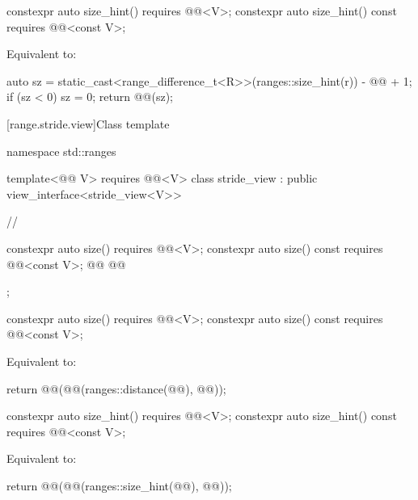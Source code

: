 \documentclass{wg21}
\begin{document}
\begin{addedblock}
\begin{itemdecl}
    constexpr auto size_hint() requires @@<V>;
    constexpr auto size_hint() const requires @@<const V>;
\end{itemdecl}

\begin{itemdescr}
    \pnum
    \effects
    Equivalent to:
    \begin{codeblock}
        auto sz = static_cast<range_difference_t<R>>(ranges::size_hint(r)) - @@ + 1;
        if (sz < 0) sz = 0;
        return @@(sz);
    \end{codeblock}
\end{itemdescr}
\end{addedblock}

[range.stride.view]{Class template }

\begin{codeblock}
namespace std::ranges {
template<@@ V>
requires @@<V>
class stride_view : public view_interface<stride_view<V>> {
    //

    constexpr auto size() requires @@<V>;
    constexpr auto size() const requires @@<const V>;
    @@
    @@
};
}
\end{codeblock}

\begin{itemdecl}
    constexpr auto size() requires @@<V>;
    constexpr auto size() const requires @@<const V>;
\end{itemdecl}

\begin{itemdescr}
    \pnum
    \effects
    Equivalent to:
    \begin{codeblock}
        return @@(@@(ranges::distance(@@), @@));
    \end{codeblock}
\end{itemdescr}

\begin{addedblock}
\begin{itemdecl}
    constexpr auto size_hint() requires @@<V>;
    constexpr auto size_hint() const requires @@<const V>;
\end{itemdecl}

\begin{itemdescr}
\pnum
\effects
Equivalent to:
\begin{codeblock}
    return @@(@@(ranges::size_hint(@@), @@));
\end{codeblock}
\end{itemdescr}
\end{addedblock}
\end{document}

